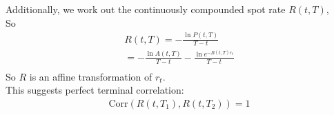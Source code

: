 Additionally, we work out the continuously compounded spot rate $R(t, T)$,\\
So
\begin{align*}
    R(t, T) = -\frac{\ln P(t, T)}{T-t} \\
    = - \frac{\ln A(t, T)}{T-t} - \frac{\ln e^{-B(t, T)r_t}}{T-t}\\
\end{align*}
So $R$ is an affine transformation of $r_t$.\\
This suggests perfect terminal correlation:
\begin{align*}
    \text{Corr}(R(t, T_1), R(t, T_2)) = 1
\end{align*}